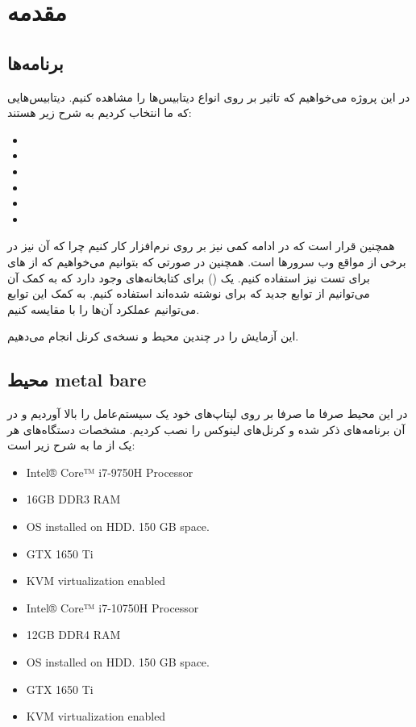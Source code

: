 \section{مقدمه}
\subsection{برنامه‌ها}
در این پروژه می‌خواهیم که تاثیر
بر روی انواع دیتابیس‌ها را مشاهده کنیم. دیتابیس‌هایی که ما انتخاب کردیم به شرح زیر هستند:
\begin{itemize}
	\item {}
	\item {}
	\item {}
	\item {}
	\item {}
	\item {}
\end{itemize}
همچنین قرار است که در ادامه کمی نیز بر روی نرم‌افزار
کار کنیم چرا که آن نیز در برخی از مواقع
وب سرور‌ها است. همچنین در صورتی که بتوانیم می‌خواهیم که از
های
برای تست نیز استفاده کنیم. یک
()
برای کتابخانه‌های
وجود دارد که به کمک آن می‌توانیم از توابع جدید
که برای
نوشته شده‌اند استفاده کنیم. به کمک این توابع می‌توانیم عملکرد آن‌ها را با
مقایسه کنیم.

این آزمایش را در چندین محیط و نسخه‌ی کرنل انجام می‌دهیم.
\subsection{محیط‌ metal bare}
در این محیط صرفا ما صرفا بر روی لپتاپ‌های خود یک سیستم‌عامل
را بالا آوردیم و در آن برنامه‌های ذکر شده و کرنل‌های لینوکس را نصب کردیم. مشخصات دستگاه‌های هر یک از ما به شرح
زیر است:

\begin{latin}
\begin{itemize}
	\item Intel® Core™ i7-9750H Processor
	\item 16GB DDR3 RAM
	\item OS installed on HDD. 150 GB space.
	\item GTX 1650 Ti
	\item KVM virtualization enabled
\end{itemize}
\end{latin}
\begin{latin}
\begin{itemize}
	\item Intel® Core™ i7-10750H Processor
	\item 12GB DDR4 RAM
	\item OS installed on HDD. 150 GB space.
	\item GTX 1650 Ti
	\item KVM virtualization enabled
\end{itemize}
\end{latin}

